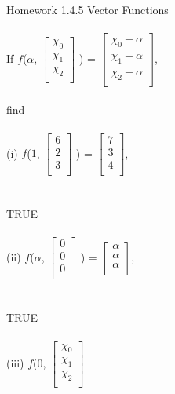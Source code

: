 \documentclass[11pt]{article}
\begin{document}
Homework 1.4.5 Vector Functions
\\
\\
If $f$($\alpha$,
$
\begin{bmatrix}
{\chi_0}\\
{\chi_1}\\
{\chi_2}\\
\end{bmatrix}$
)
=
$
\begin{bmatrix}
{\chi_0 + \alpha}\\
{\chi_1 + \alpha}\\
{\chi_2 + \alpha}\\
\end{bmatrix}$,
\\
\\
find
\\
\\
(i)
$f$($1$,
$
\begin{bmatrix}
{6}\\
{2}\\
{3}\\
\end{bmatrix}$
)
=
$
\begin{bmatrix}
{7}\\
{3}\\
{4}\\
\end{bmatrix}$,
\\
\\
\\
TRUE
\\
\\
(ii)
$f$($\alpha$,
$
\begin{bmatrix}
{0}\\
{0}\\
{0}\\
\end{bmatrix}$
)
=
$
\begin{bmatrix}
{\alpha}\\
{\alpha}\\
{\alpha}\\
\end{bmatrix}$,
\\
\\
\\
TRUE
\\
\\
(iii)
$f$($0$,
$
\begin{bmatrix}
{\chi_{0}}\\
{\chi_{1}}\\
{\chi_{2}}\\
\end{bmatrix}$
\end{document}
